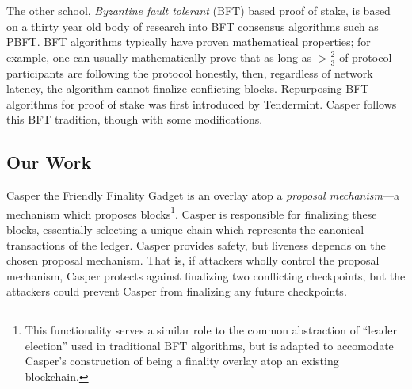 \documentclass[12pt]{article}
\begin{document}
The other school, \textit{Byzantine fault tolerant} (BFT) based proof of stake, is based on a thirty year old body of research into BFT consensus algorithms such as PBFT\cite{castro1999practical}. BFT algorithms typically have proven mathematical properties; for example, one can usually mathematically prove that as long as $>\!\frac{2}{3}$ of protocol participants are following the protocol honestly, then, regardless of network latency, the algorithm cannot finalize conflicting blocks.  Repurposing BFT algorithms for proof of stake was first introduced by Tendermint\cite{kwon2014tendermint}.  Casper follows this BFT tradition, though with some modifications.

\subsection{Our Work}
Casper the Friendly Finality Gadget is an overlay atop a \emph{proposal mechanism}---a mechanism which proposes blocks\footnote{This functionality serves a similar role to the common abstraction of ``leader election'' used in traditional BFT algorithms, but is adapted to accomodate Casper's construction of being a finality overlay atop an existing blockchain.}.  Casper is responsible for finalizing these blocks, essentially selecting a
unique chain which represents the canonical transactions of the ledger.  Casper provides safety, but liveness depends on the chosen proposal mechanism.  That is, if attackers wholly control the proposal mechanism, Casper protects against finalizing two conflicting checkpoints, but the attackers could prevent Casper from finalizing any future checkpoints.
\end{document}
